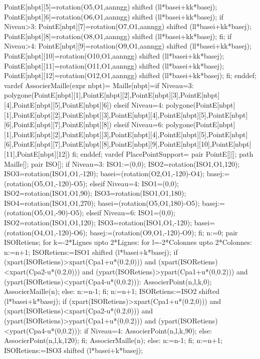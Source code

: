{  PointE[nbpt][5]=rotation(O5,O1,aanngg) shifted (ll*basei+kk*basej);
  PointE[nbpt][6]=rotation(O6,O1,aanngg) shifted (ll*basei+kk*basej);
  if Niveau>3:
  PointE[nbpt][7]=rotation(O7,O1,aanngg) shifted (ll*basei+kk*basej);
  PointE[nbpt][8]=rotation(O8,O1,aanngg) shifted (ll*basei+kk*basej);
  fi;
  if Niveau>4:
  PointE[nbpt][9]=rotation(O9,O1,aanngg) shifted (ll*basei+kk*basej);
  PointE[nbpt][10]=rotation(O10,O1,aanngg) shifted (ll*basei+kk*basej);
  PointE[nbpt][11]=rotation(O11,O1,aanngg) shifted (ll*basei+kk*basej);
  PointE[nbpt][12]=rotation(O12,O1,aanngg) shifted (ll*basei+kk*basej);
  fi;
  enddef;
  vardef AssocierMaille(expr nbpt)=
  Maille[nbpt]=if Niveau=3:
  polygone(PointE[nbpt][1],PointE[nbpt][2],PointE[nbpt][3],PointE[nbpt][4],PointE[nbpt][5],PointE[nbpt][6])
  elseif Niveau=4:
  polygone(PointE[nbpt][1],PointE[nbpt][2],PointE[nbpt][3],PointE[nbpt][4],PointE[nbpt][5],PointE[nbpt][6],PointE[nbpt][7],PointE[nbpt][8])
  elseif Niveau=6:
  polygone(PointE[nbpt][1],PointE[nbpt][2],PointE[nbpt][3],PointE[nbpt][4],PointE[nbpt][5],PointE[nbpt][6],PointE[nbpt][7],PointE[nbpt][8],PointE[nbpt][9],PointE[nbpt][10],PointE[nbpt][11],PointE[nbpt][12])
  fi;
  enddef;
  vardef PlacePointSupport=
  pair PointE[][];
  path Maille[];
  pair ISO[];
  if Niveau=3:
  ISO1:=(0,0);
  ISO2=rotation(ISO1,O1,120);
  ISO3=rotation(ISO1,O1,-120);
  basei=(rotation(O2,O1,-120)-O4);
  basej:=(rotation(O5,O1,-120)-O5);
  elseif Niveau=4:
  ISO1=(0,0);
  ISO2=rotation(ISO1,O1,90);
  ISO3=rotation(ISO1,O1,180);
  ISO4=rotation(ISO1,O1,270);
  basei=(rotation(O5,O1,180)-O5);
  basej:=(rotation(O5,O1,-90)-O5);
  elseif Niveau=6:
  ISO1=(0,0);
  ISO2=rotation(ISO1,O1,120);
  ISO3=rotation(ISO1,O1,-120);
  basei=(rotation(O4,O1,-120)-O6);
  basej:=(rotation(O9,O1,-120)-O9);
  fi;
  n:=0;
  pair ISORetiens;
  for k=-2*Lignes upto 2*Lignes:
  for l=-2*Colonnes upto 2*Colonnes:
  n:=n+1;
  ISORetiens:=ISO1 shifted (l*basei+k*basej);
  if (xpart(ISORetiens)>xpart(Cpa1+u*(0.2,0))) and (xpart(ISORetiens)<xpart(Cpa2-u*(0.2,0))) and (ypart(ISORetiens)>ypart(Cpa1+u*(0,0.2))) and (ypart(ISORetiens)<ypart(Cpa4-u*(0,0.2))):
  AssocierPoint(n,l,k,0);
  AssocierMaille(n);
  else:
  n:=n-1;
  fi;
  n:=n+1;
  ISORetiens:=ISO2 shifted (l*basei+k*basej);
  if (xpart(ISORetiens)>xpart(Cpa1+u*(0.2,0))) and (xpart(ISORetiens)<xpart(Cpa2-u*(0.2,0))) and (ypart(ISORetiens)>ypart(Cpa1+u*(0,0.2))) and (ypart(ISORetiens)<ypart(Cpa4-u*(0,0.2))):
  if Niveau=4:
  AssocierPoint(n,l,k,90);
  else:
  AssocierPoint(n,l,k,120);
  fi;
  AssocierMaille(n);
  else:
  n:=n-1;
  fi;
  n:=n+1;
  ISORetiens:=ISO3 shifted (l*basei+k*basej);
}
